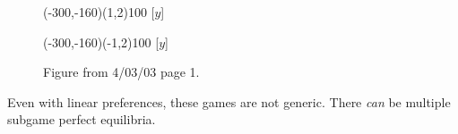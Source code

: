 \documentclass[12pt]{article}
\newcommand{\n}{\noindent}
\newcommand{\s}{\vspace{5mm}}
\begin{document}
\begin{figure}[htb]
\begin{egame}
\putbranch(-300,-160)(1,2){100}
[$y$]

\renewcommand{\egarrowstyle}{}

\putbranch(-300,-160)(-1,2){100}
[$y$]


%
\end{egame}
\hspace*{\fill}\s\s\s\s\s\s\s\s\s
\caption[]{Figure from 4/03/03 page 1.}\label{f:one}
\end{figure}

\s
\n  Even with linear preferences, these games are not generic.  There \textit{can} be multiple subgame perfect equilibria.  
\end{document}
